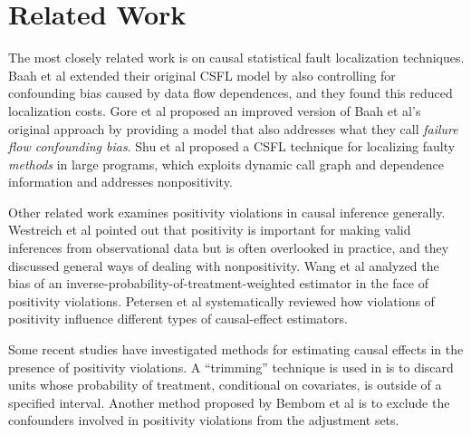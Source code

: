 \section{Related Work}
The most closely related work is on causal statistical fault localization techniques.  Baah et al \cite{baah2011mitigating} extended their original CSFL model by also controlling for confounding bias caused by data flow dependences, and they found this reduced localization costs.  Gore et al \cite{gore2012reducing} proposed an improved version of Baah et al’s original approach by providing a model that also addresses what they call {\it failure flow confounding bias}.  Shu et al \cite{shu2013mfl} proposed a CSFL technique for localizing faulty {\it methods} in large programs, which exploits dynamic call graph and dependence information and addresses nonpositivity.

Other related work examines positivity violations in causal inference generally.  Westreich et al \cite{westreich2010invited} pointed out that positivity is important for making valid inferences from observational data but is often overlooked in practice, and they discussed general ways of dealing with nonpositivity.  Wang et al \cite{wang2006diagnosing} analyzed the bias of an inverse-probability-of-treatment-weighted estimator in the face of positivity violations.  Petersen et al \cite{petersen2010diagnosing} systematically reviewed how violations of positivity influence different types of causal-effect estimators.

Some recent studies have investigated methods for estimating causal effects in the presence of positivity violations. A ``trimming” technique is used in \cite{crump2006moving} is to discard units whose probability of treatment, conditional on covariates, is outside of a specified interval.  Another method proposed by Bembom et al  \cite{bembom2008data} is to exclude the confounders involved in positivity violations from the adjustment sets.  


